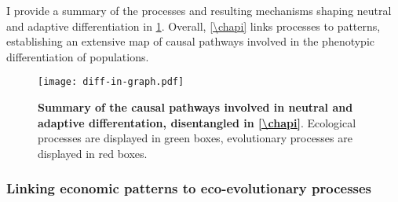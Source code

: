 I provide a summary of the processes and resulting mechanisms shaping neutral and adaptive differentiation in \cref{fig:summary_diff-in-graph}. Overall, \cref{\chapi} links processes to patterns, establishing an extensive map of causal pathways involved in the phenotypic differentiation of populations. %

\begin{figure}[t]
    \centering
    \texttt{[image: diff-in-graph.pdf]}
    \caption{\textbf{Summary of the causal pathways involved in neutral and adaptive differentation, disentangled in \cref{\chapi}}. Ecological processes are displayed in green boxes, evolutionary processes are displayed in red boxes.}
    \label{fig:summary_diff-in-graph}
\end{figure}


\subsubsection{Linking economic patterns to eco-evolutionary processes}

